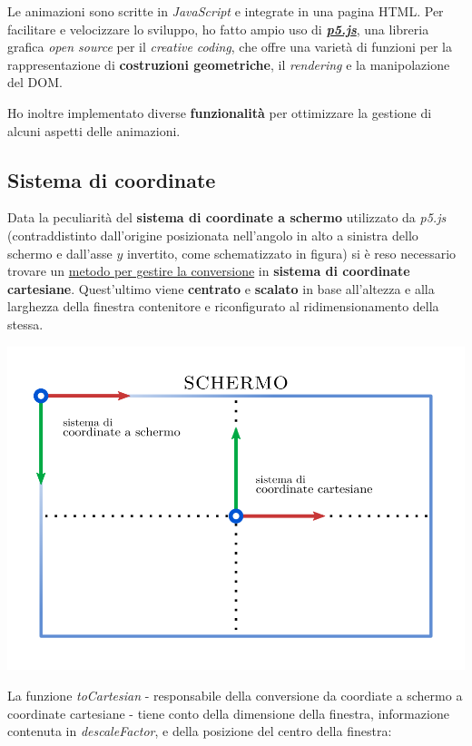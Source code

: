 \documentclass[
]{book}
\begin{document}
Le animazioni sono scritte in \emph{JavaScript} e integrate in una pagina HTML. Per facilitare e velocizzare lo sviluppo, ho fatto ampio uso di \href{https://p5js.org/}{\emph{\textbf{p5.js}}}, una libreria grafica \emph{open source} per il \emph{creative coding}, che offre una varietà di funzioni per la rappresentazione di \textbf{costruzioni geometriche}, il \emph{rendering} e la manipolazione del DOM.

Ho inoltre implementato diverse \textbf{funzionalità} per ottimizzare la gestione di alcuni aspetti delle animazioni.

\hypertarget{coordsystem}{%
\subsection{Sistema di coordinate}\label{coordsystem}}

Data la peculiarità del \textbf{sistema di coordinate a schermo} utilizzato da \emph{p5.js} (contraddistinto dall'origine posizionata nell'angolo in alto a sinistra dello schermo e dall'asse \(y\) invertito, come schematizzato in figura) si è reso necessario trovare un \href{https://github.com/Bradwave/thesis/blob/master/animations/js/utils/coordinateSystem.js}{metodo per gestire la conversione} in \textbf{sistema di coordinate cartesiane}. Quest'ultimo viene \textbf{centrato} e \textbf{scalato} in base all'altezza e alla larghezza della finestra contenitore e riconfigurato al ridimensionamento della stessa.

\begin{center}\includegraphics[width=0.6\linewidth]{_images/screen} \end{center}

La funzione \emph{toCartesian} - responsabile della conversione da coordiate a schermo a coordinate cartesiane - tiene conto della dimensione della finestra, informazione contenuta in \emph{descaleFactor}, e della posizione del centro della finestra:
\end{document}
